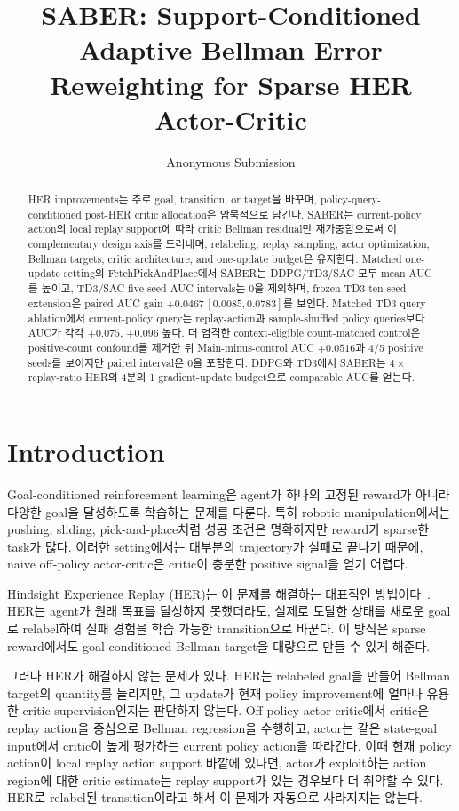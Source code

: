 \documentclass[letterpaper]{article}
\title{SABER: Support-Conditioned Adaptive Bellman Error Reweighting for Sparse HER Actor-Critic}
\author{Anonymous Submission}
\begin{document}
\maketitle

\begin{abstract}
HER improvements는 주로 goal, transition, or target을 바꾸며, policy-query-conditioned post-HER critic allocation은 암묵적으로 남긴다.
SABER는 current-policy action의 local replay support에 따라 critic Bellman residual만 재가중함으로써 이 complementary design axis를 드러내며, relabeling, replay sampling, actor optimization, Bellman targets, critic architecture, and one-update budget은 유지한다.
Matched one-update setting의 FetchPickAndPlace에서 SABER는 DDPG/TD3/SAC 모두 mean AUC를 높이고, TD3/SAC five-seed AUC intervals는 0을 제외하며, frozen TD3 ten-seed extension은 paired AUC gain $+0.0467\,[0.0085,0.0783]$를 보인다.
Matched TD3 query ablation에서 current-policy query는 replay-action과 sample-shuffled policy queries보다 AUC가 각각 $+0.075$, $+0.096$ 높다. 더 엄격한 context-eligible count-matched control은 positive-count confound를 제거한 뒤 Main-minus-control AUC $+0.0516$과 4/5 positive seeds를 보이지만 paired interval은 0을 포함한다. DDPG와 TD3에서 SABER는 $4\times$ replay-ratio HER의 4분의 1 gradient-update budget으로 comparable AUC를 얻는다.
\end{abstract}

\section{Introduction}

Goal-conditioned reinforcement learning은 agent가 하나의 고정된 reward가 아니라 다양한 goal을 달성하도록 학습하는 문제를 다룬다. 특히 robotic manipulation에서는 pushing, sliding, pick-and-place처럼 성공 조건은 명확하지만 reward가 sparse한 task가 많다. 이러한 setting에서는 대부분의 trajectory가 실패로 끝나기 때문에, naive off-policy actor-critic은 critic이 충분한 positive signal을 얻기 어렵다.

Hindsight Experience Replay (HER)는 이 문제를 해결하는 대표적인 방법이다~\citep{andrychowicz2017her}. HER는 agent가 원래 목표를 달성하지 못했더라도, 실제로 도달한 상태를 새로운 goal로 relabel하여 실패 경험을 학습 가능한 transition으로 바꾼다. 이 방식은 sparse reward에서도 goal-conditioned Bellman target을 대량으로 만들 수 있게 해준다.

그러나 HER가 해결하지 않는 문제가 있다. HER는 relabeled goal을 만들어 Bellman target의 quantity를 늘리지만, 그 update가 현재 policy improvement에 얼마나 유용한 critic supervision인지는 판단하지 않는다. Off-policy actor-critic에서 critic은 replay action을 중심으로 Bellman regression을 수행하고, actor는 같은 state-goal input에서 critic이 높게 평가하는 current policy action을 따라간다. 이때 현재 policy action이 local replay action support 바깥에 있다면, actor가 exploit하는 action region에 대한 critic estimate는 replay support가 있는 경우보다 더 취약할 수 있다. HER로 relabel된 transition이라고 해서 이 문제가 자동으로 사라지지는 않는다.
\end{document}
